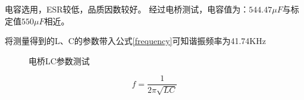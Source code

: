 ﻿\documentclass[UTF-8,a4paper,12pt]{ctexart}
\def\red{\color{red}}
\begin{document}
            电容选用{\red{无极性同轴电容}}，ESR较低，品质因数较好。
            经过电桥测试，电容值为：$544.47\mu F$与标定值$550\mu F$相近。

            将测量得到的L、C的参数带入公式\ref{frequency}可知谐振频率为41.74KHz
                \begin{figure}[htbp]
                \centering %
                \caption{电桥LC参数测试} %
                \label{电桥LC参数测试}         %
                \end{figure}
                    \begin{equation}
                    f=\frac{1}{2\pi\sqrt{LC}}
                    \label{frequency}
                    \end{equation}
\end{document}
